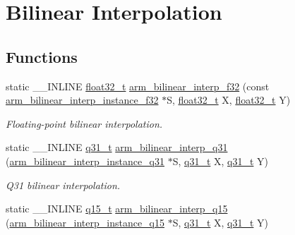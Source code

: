 \hypertarget{group___bilinear_interpolate}{}\section{Bilinear Interpolation}
\label{group___bilinear_interpolate}
\subsection*{Functions}
\begin{DoxyCompactItemize}
\item 
static \+\_\+\+\_\+\+I\+N\+L\+I\+NE \hyperlink{arm__math_8h_a4611b605e45ab401f02cab15c5e38715}{float32\+\_\+t} \hyperlink{group___bilinear_interpolate_gab49a4c0f64854903d996d01ba38f711a}{arm\+\_\+bilinear\+\_\+interp\+\_\+f32} (const \hyperlink{structarm__bilinear__interp__instance__f32}{arm\+\_\+bilinear\+\_\+interp\+\_\+instance\+\_\+f32} $\ast$S, \hyperlink{arm__math_8h_a4611b605e45ab401f02cab15c5e38715}{float32\+\_\+t} X, \hyperlink{arm__math_8h_a4611b605e45ab401f02cab15c5e38715}{float32\+\_\+t} Y)
\begin{DoxyCompactList}\small\item\em Floating-\/point bilinear interpolation. \end{DoxyCompactList}\item 
static \+\_\+\+\_\+\+I\+N\+L\+I\+NE \hyperlink{arm__math_8h_adc89a3547f5324b7b3b95adec3806bc0}{q31\+\_\+t} \hyperlink{group___bilinear_interpolate_ga202a033c8a2ad3678b136f93153b6d13}{arm\+\_\+bilinear\+\_\+interp\+\_\+q31} (\hyperlink{structarm__bilinear__interp__instance__q31}{arm\+\_\+bilinear\+\_\+interp\+\_\+instance\+\_\+q31} $\ast$S, \hyperlink{arm__math_8h_adc89a3547f5324b7b3b95adec3806bc0}{q31\+\_\+t} X, \hyperlink{arm__math_8h_adc89a3547f5324b7b3b95adec3806bc0}{q31\+\_\+t} Y)
\begin{DoxyCompactList}\small\item\em Q31 bilinear interpolation. \end{DoxyCompactList}\item 
static \+\_\+\+\_\+\+I\+N\+L\+I\+NE \hyperlink{arm__math_8h_ab5a8fb21a5b3b983d5f54f31614052ea}{q15\+\_\+t} \hyperlink{group___bilinear_interpolate_gaa8dffbc2a01bb7accf231384498ec85e}{arm\+\_\+bilinear\+\_\+interp\+\_\+q15} (\hyperlink{structarm__bilinear__interp__instance__q15}{arm\+\_\+bilinear\+\_\+interp\+\_\+instance\+\_\+q15} $\ast$S, \hyperlink{arm__math_8h_adc89a3547f5324b7b3b95adec3806bc0}{q31\+\_\+t} X, \hyperlink{arm__math_8h_adc89a3547f5324b7b3b95adec3806bc0}{q31\+\_\+t} Y)

\end{DoxyCompactItemize}
